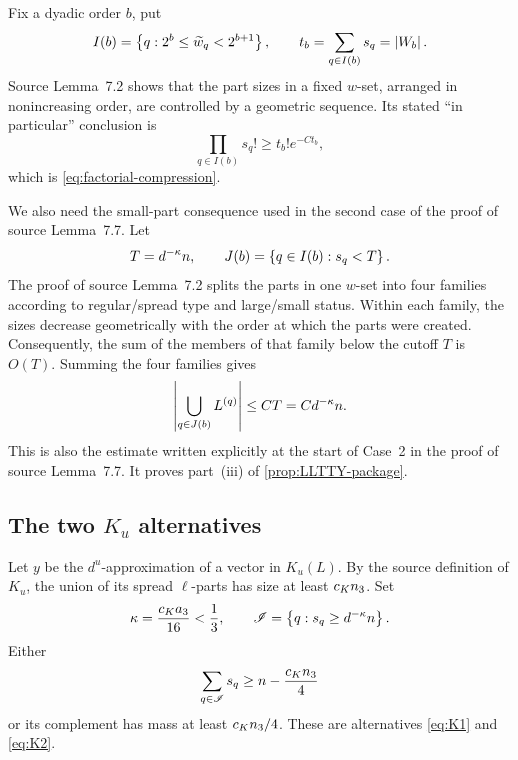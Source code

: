 Fix a dyadic order $b$, put
\[
  I(b)=\left\{q:2^b\le\widetilde w_q<2^{b+1}\right\},
  \qquad
  t_b=\sum_{q\in I(b)}s_q=\left|W_b\right|.
\]
Source Lemma~7.2 shows that the part sizes in a fixed $w$-set, arranged in nonincreasing order, are controlled by a geometric sequence. Its stated ``in particular'' conclusion is
\[
  \prod_{q\in I(b)}s_q!\ge t_b!e^{-Ct_b},
\]
which is \eqref{eq:factorial-compression}.

We also need the small-part consequence used in the second case of the proof of source Lemma~7.7. Let
\[
  T=d^{-\kappa}n,
  \qquad
  J(b)=\left\{q\in I(b):s_q<T\right\}.
\]
The proof of source Lemma~7.2 splits the parts in one $w$-set into four families according to regular/spread type and large/small status. Within each family, the sizes decrease geometrically with the order at which the parts were created. Consequently, the sum of the members of that family below the cutoff $T$ is $O(T)$. Summing the four families gives
\[
  \left|\bigcup_{q\in J(b)}L^{(q)}\right|\le CT=Cd^{-\kappa}n.
\]
This is also the estimate written explicitly at the start of Case~2 in the proof of source Lemma~7.7. It proves part~(iii) of \cref{prop:LLTTY-package}.

\subsection{\texorpdfstring{The two $K_u$ alternatives}{The two Ku alternatives}}

Let $y$ be the $d^u$-approximation of a vector in $K_u(L)$. By the source definition of $K_u$, the union of its spread $\ell$-parts has size at least $c_K n_3$. Set
\[
  \kappa=\frac{c_K a_3}{16}<\frac13,
  \qquad
  \mathscr I=\left\{q:s_q\ge d^{-\kappa}n\right\}.
\]
Either
\[
  \sum_{q\in\mathscr I}s_q\ge n-\frac{c_K n_3}{4}
\]
or its complement has mass at least $c_K n_3/4$. These are alternatives \eqref{eq:K1} and \eqref{eq:K2}.

